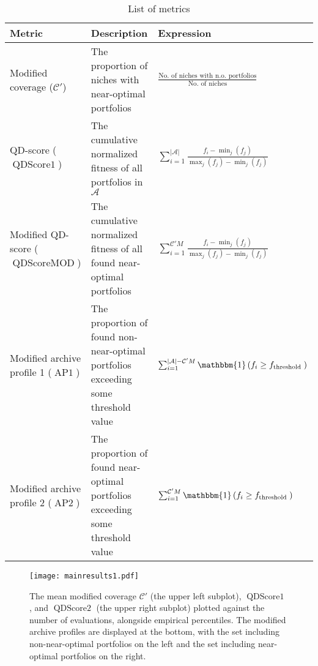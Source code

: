 \begin{table}[htbp]
    \centering
    \caption{List of metrics}
    \label{tab:metrics}
    \begin{tabularx}{\textwidth}{>{\raggedright\arraybackslash}X >{\raggedright\arraybackslash}X >{\raggedright\arraybackslash}X}
        \toprule
        \textbf{Metric} & \textbf{Description} & \textbf{Expression} \\
        \midrule
        Modified coverage ($\mathcal{C'}$) & The proportion of niches with near-optimal portfolios  & $\frac{\text{No. of niches with n.o. portfolios}}{\text{No. of niches}}$ \\
        \midrule
        QD-score ($\operatorname{QDScore1}$) & The cumulative normalized fitness of all portfolios in $\mathcal{A}$ & $\sum_{i=1}^{|\mathcal{A}|} \frac{f_i-\min _j\left(f_j\right)}{\max _j\left(f_j\right)-\min _j\left(f_j\right)}$ \\
        \midrule
        Modified QD-score ($\operatorname{QDScoreMOD}$) & The cumulative normalized fitness of all found near-optimal portfolios  & $\sum_{i=1}^{\mathcal{C'}M} \frac{f_i-\min _j\left(f_j\right)}{\max _j\left(f_j\right)-\min _j\left(f_j\right)}$ \\
        \midrule
        Modified archive profile 1 ($\operatorname{AP1}$) & The proportion of found non-near-optimal portfolios exceeding some threshold value  & $\sum_{i=1}^{|\mathcal{A}|-\mathcal{C'}M} \mathbbm{1} \left(f_i \geq f_{\text {threshold }}\right)$ \\
        \midrule
        Modified archive profile 2 ($\operatorname{AP2}$) & The proportion of found near-optimal portfolios exceeding some threshold value  & $\sum_{i=1}^{\mathcal{C'}M} \mathbbm{1} \left(f_i \geq f_{\text {threshold }}\right)$ \\
        \bottomrule

    \end{tabularx}
\end{table}

\begin{figure}[ht!]
\texttt{[image: mainresults1.pdf]}
\centering
\caption{The mean modified coverage $\mathcal{C'}$ (the upper left subplot), $\operatorname{QDScore1}$, and $\operatorname{QDScore2}$ (the upper right subplot) plotted against the number of evaluations, alongside empirical percentiles. The modified archive profiles are displayed at the bottom, with the set including non-near-optimal portfolios on the left and the set including near-optimal portfolios on the right.}
\label{figure4}
\end{figure}
\vspace{-0.50cm}
